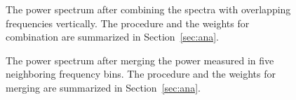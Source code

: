 \begin{figure}[htbp]                                                                                                  
    \centering                                                                                                                       
    \caption{The power spectrum after combining the spectra with overlapping 
frequencies vertically. The procedure and the weights for combination 
are summarized in Section~\ref{sec:ana}.}                
\label{fig:faxioncombine}                                                                                                            
\end{figure}                       


\begin{figure}[htbp]                                                                                                  
    \centering                                                                                                                       
    \caption{The power spectrum after merging the power measured in five 
neighboring frequency bins. The procedure and the weights for merging 
are summarized in Section~\ref{sec:ana}.}                
\label{fig:faxionmerge}    
\end{figure}                       

   
